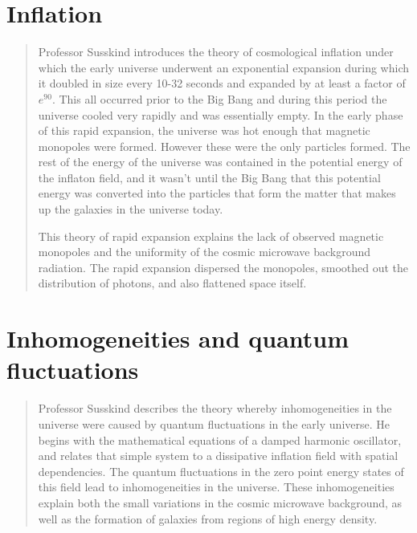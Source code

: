 \documentclass[]{article}
\begin{document}
\section{Inflation}

\begin{quotation}
	

	Professor Susskind introduces the theory of cosmological inflation under which the early universe underwent an exponential expansion during which it doubled in size every 10-32 seconds and expanded by at least a factor of $e^{90}$.  This all occurred prior to the Big Bang and during this period the universe cooled very rapidly and was essentially empty.  In the early phase of this rapid expansion, the universe was hot enough that magnetic monopoles were formed.  However these were the only particles formed.  The rest of the energy of the universe was contained in the potential energy of the inflaton field, and it wasn't until the Big Bang that this potential energy was converted into the particles that form the matter that makes up the galaxies in the universe today.
	
	This theory of rapid expansion explains the lack of observed magnetic monopoles and the uniformity of the cosmic microwave background radiation.  The rapid expansion dispersed the monopoles, smoothed out the distribution of photons, and also flattened space itself.
	
\end{quotation}

\section{Inhomogeneities and quantum fluctuations}

\begin{quotation}
Professor Susskind describes the theory whereby inhomogeneities in the universe were caused by quantum fluctuations in the early universe.  He begins with the mathematical equations of a damped harmonic oscillator, and relates that simple system to a dissipative inflation field with spatial dependencies.  The quantum fluctuations in the zero point energy states of this field lead to inhomogeneities in the universe.  These inhomogeneities explain both the small variations in the cosmic microwave background, as well as the formation of galaxies from regions of high energy density.
\end{quotation}

\printglossaries


\raggedright

\end{document}

